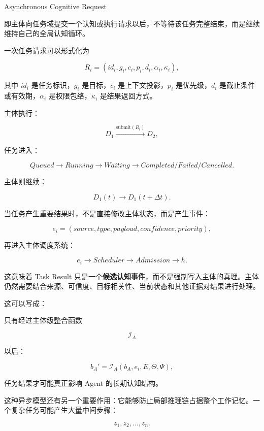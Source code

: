 \begin{statementbox}
Asynchronous Cognitive Request
\end{statementbox}

即主体向任务域提交一个认知或执行请求以后，不等待该任务完整结束，而是继续维持自己的全局认知循环。

一次任务请求可以形式化为

\[
R_i
=
(
id_i,
g_i,
c_i,
p_i,
d_i,
\alpha_i,
\kappa_i
),
\]

其中 $id_i$ 是任务标识，$g_i$ 是目标，$c_i$ 是上下文投影，$p_i$ 是优先级，$d_i$ 是截止条件或有效期，$\alpha_i$ 是权限包络，$\kappa_i$ 是结果返回方式。

主体执行：

\[
D_1
\xrightarrow{\mathrm{submit}(R_i)}
D_2,
\]

任务进入：

\[
Queued
\rightarrow
Running
\rightarrow
Waiting
\rightarrow
Completed/Failed/Cancelled.
\]

主体则继续：

\[
D_1(t)
\rightarrow
D_1(t+\Delta t).
\]

当任务产生重要结果时，不是直接修改主体状态，而是产生事件：

\[
e_i
=
(
source,
type,
payload,
confidence,
priority
),
\]

再进入主体调度系统：

\[
e_i
\rightarrow
Scheduler
\rightarrow
Admission
\rightarrow
h.
\]

这意味着 Task Result 只是一个\textbf{候选认知事件}，而不是强制写入主体的真理。主体仍然需要结合来源、可信度、目标相关性、当前状态和其他证据对结果进行处理。

这可以写成：

\begin{statementbox}
\centering
{}
\end{statementbox}

只有经过主体级整合函数

\[
\mathcal{I}_A
\]

以后：

\[
b_A'
=
\mathcal{I}_A(
b_A,
e_i,
E,
\Theta,
\Psi
),
\]

任务结果才可能真正影响 Agent 的长期认知结构。

这种异步模型还有另一个重要作用：它能够防止局部推理链占据整个工作记忆。一个复杂任务可能产生大量中间步骤：

\[
z_1,z_2,\ldots,z_n.
\]

